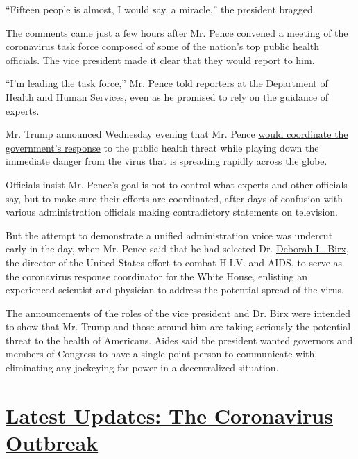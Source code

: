``Fifteen people is almost, I would say, a miracle,'' the president
bragged.

The comments came just a few hours after Mr. Pence convened a meeting of
the coronavirus task force composed of some of the nation's top public
health officials. The vice president made it clear that they would
report to him.

``I'm leading the task force,'' Mr. Pence told reporters at the
Department of Health and Human Services, even as he promised to rely on
the guidance of experts.

Mr. Trump announced Wednesday evening that Mr. Pence
\href{https://www.nytimes3xbfgragh.onion/2020/02/26/us/politics/trump-coronavirus-cdc.html}{would
coordinate the government's response} to the public health threat while
playing down the immediate danger from the virus that is
\href{https://www.nytimes3xbfgragh.onion/interactive/2020/world/asia/china-wuhan-coronavirus-maps.html}{spreading
rapidly across the globe}.

Officials insist Mr. Pence's goal is not to control what experts and
other officials say, but to make sure their efforts are coordinated,
after days of confusion with various administration officials making
contradictory statements on television.

But the attempt to demonstrate a unified administration voice was
undercut early in the day, when Mr. Pence said that he had selected Dr.
\href{https://www.nytimes3xbfgragh.onion/2020/03/06/us/politics/coronavirus-trump-deborah-birx.html}{Deborah
L. Birx}, the director of the United States effort to combat H.I.V. and
AIDS, to serve as the coronavirus response coordinator for the White
House, enlisting an experienced scientist and physician to address the
potential spread of the virus.

The announcements of the roles of the vice president and Dr. Birx were
intended to show that Mr. Trump and those around him are taking
seriously the potential threat to the health of Americans. Aides said
the president wanted governors and members of Congress to have a single
point person to communicate with, eliminating any jockeying for power in
a decentralized situation.

\hypertarget{latest-updates-the-coronavirus-outbreak}{%
\section{\texorpdfstring{\href{https://www.nytimes3xbfgragh.onion/2020/08/20/world/coronavirus-covid.html?action=click\&pgtype=Article\&state=default\&region=MAIN_CONTENT_1\&context=storylines_live_updates}{Latest
Updates: The Coronavirus
Outbreak}}{Latest Updates: The Coronavirus Outbreak}}\label{latest-updates-the-coronavirus-outbreak}}


